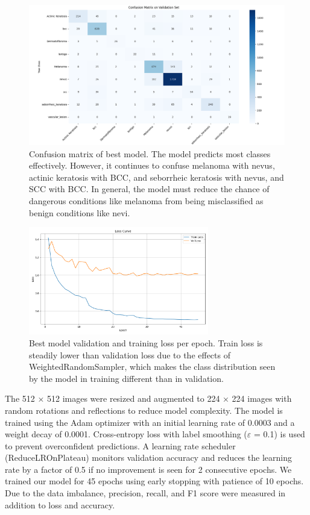 \documentclass{article} %
\begin{document}
\begin{figure}[h]
\begin{center}
\includegraphics[width=1.0\textwidth]{Figs/confusion_matrix.png}
\end{center}
\caption{Confusion matrix of best model. The model predicts most classes effectively. However, it continues to confuse melanoma with nevus, actinic keratosis with BCC, and seborrheic keratosis with nevus, and SCC with BCC. In general, the model must reduce the chance of dangerous conditions like melanoma from being misclassified as benign conditions like nevi.}
\end{figure}

\begin{figure}[h]
\begin{center}
\includegraphics[width=0.7\textwidth]{Figs/training_validation_loss.png}
\end{center}
\caption{Best model validation and training loss per epoch. Train loss is steadily lower than validation loss due to the effects of WeightedRandomSampler, which makes the class distribution seen by the model in training different than in validation.}
\end{figure}

The 512 × 512 images were resized and augmented to 224 × 224 images with random rotations and reflections to reduce model complexity. The model is trained using the Adam optimizer with an initial learning rate of 0.0003 and a weight decay of 0.0001. Cross-entropy loss with label smoothing ($\varepsilon$ = 0.1) is used to prevent overconfident predictions. A learning rate scheduler (ReduceLROnPlateau) monitors validation accuracy and reduces the learning rate by a factor of 0.5 if no improvement is seen for 2 consecutive epochs. We trained our model for 45 epochs using early stopping with patience of 10 epochs. Due to the data imbalance, precision, recall, and F1 score were measured in addition to loss and accuracy.
\end{document}

